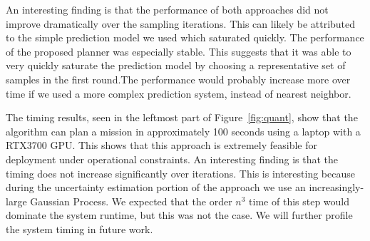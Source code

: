 An interesting finding is that the performance of both approaches did not improve dramatically over the sampling iterations. This can likely be attributed to the simple prediction model we used which saturated quickly. The performance of the proposed planner was especially stable. This suggests that it was able to very quickly saturate the prediction model by choosing a representative set of samples in the first round.The performance would probably increase more over time if we used a more complex prediction system, instead of nearest neighbor. 

The timing results, seen in the leftmost part of Figure~\ref{fig:quant}, show that the algorithm can plan a mission in approximately 100 seconds using a laptop with a RTX3700 GPU. This shows that this approach is extremely feasible for deployment under operational constraints. An interesting finding is that the timing does not increase significantly over iterations. This is interesting because during the uncertainty estimation portion of the approach we use an increasingly-large Gaussian Process. We expected that the order $n^3$ time of this step would dominate the system runtime, but this was not the case. We will further profile the system timing in future work.



